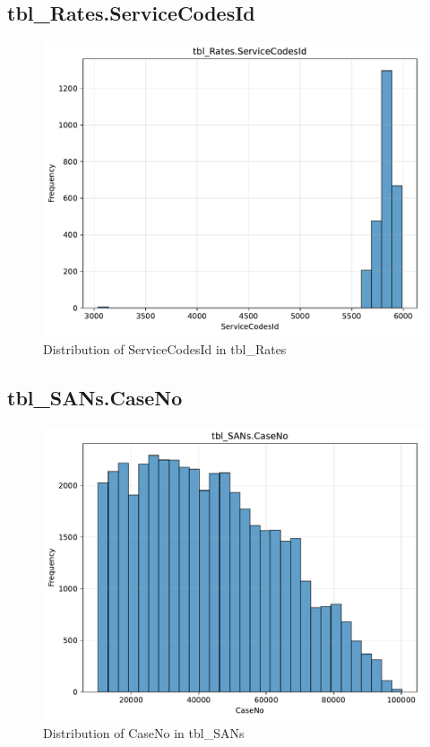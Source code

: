 \subsection{tbl\_Rates.ServiceCodesId}

\begin{figure}[htbp]
\centering
\includegraphics[width=\textwidth]{figures/dbo_tbl_Rates_ServiceCodesId.pdf}
\caption{Distribution of ServiceCodesId in tbl\_Rates}
\end{figure}\newpage

\subsection{tbl\_SANs.CaseNo}

\begin{figure}[htbp]
\centering
\includegraphics[width=\textwidth]{figures/dbo_tbl_SANs_CaseNo.pdf}
\caption{Distribution of CaseNo in tbl\_SANs}
\end{figure}\newpage

